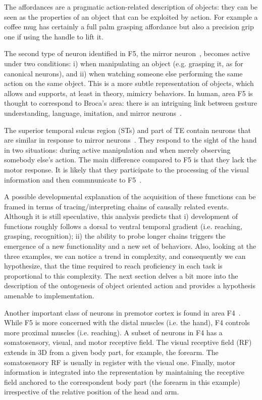 \ifverbose
%
The affordances are a pragmatic action-related description of objects:
they can be seen as the properties of an object that can be exploited
by action.  For example a coffee mug has certainly a full palm
grasping affordance but also a precision grip one if using the handle
to lift it.
%
\fi

The second type of neuron identified in F5, the mirror neuron~\cite{fadiga00visuomotor}, becomes active under two conditions: i)
when manipulating an object (e.g. grasping it, as for canonical neurons), and ii) when watching
someone else performing the same action on the same object. This is a
more subtle representation of objects, which allows and supports, at
least in theory, mimicry behaviors. In human, area F5 is thought to
correspond to Broca's area: there is an intriguing link between
gesture understanding, language, imitation, and mirror neurons~\cite{rizzolatti98language}.

The superior temporal sulcus region (STs) and part of TE contain neurons
that are similar in response to mirror neurons~\cite{perret-mistlin-harries-chitty-1990}. 
They respond to the 
sight of the hand in two situations: during active manipulation
and when merely observing somebody else's action. The main difference compared to F5
is that they lack the motor response. It is likely that they participate to the 
processing of the visual information and then commnunicate to F5~\cite{gallese-fadiga-fogassi-rizzolatti-1996}.

A possible developmental explanation of the acquisition of
these functions can be framed in terms of tracing/interpreting chains 
of causally related events. Although it is still speculative, this analysis 
predicts that i) development of functions roughly follows a dorsal to ventral 
temporal gradient (i.e. reaching, grasping, recognition); ii) the 
ability to probe longer chains triggers the emergence of a new functionality 
and a new set of behaviors. 
\ifverbose
Also, looking at the three examples, we can notice 
a trend in complexity, and consequently we can hypothesize, that the time 
required to reach proficiency in each task is proportional to this complexity.
\fi
The next section delves a bit more into 
the description of the ontogenesis of object oriented action and
provides a hypothesis amenable to implementation.


\ifverbose
Another important class of neurons in premotor cortex is found in area
F4~\cite{fogassi96coding}. While F5 is more concerned with the distal
muscles (i.e. the hand), F4 controls more proximal muscles (i.e.
reaching). A subset of neurons in F4 has a somatosensory, visual, and
motor receptive field. The visual receptive field (RF) extends in 3D
from a given body part, for example, the forearm. The somatosensory RF
is usually in register with the visual one. Finally, motor information
is integrated into the representation by maintaining the receptive
field anchored to the correspondent body part (the forearm in this
example) irrespective of the relative position of the head and arm.
\fi
